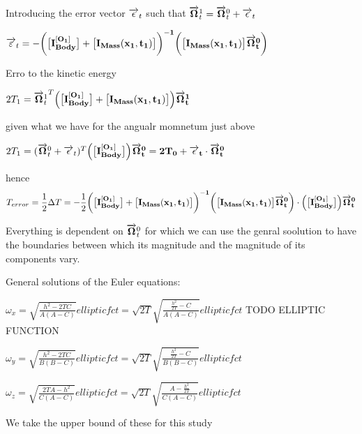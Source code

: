 Introducing the error vector $\overrightarrow{\bf \epsilon}_{t}$ such that $\overrightarrow{\bf \Omega}^{1}_{t}=\overrightarrow{\bf \Omega}^{0}_{t}+\overrightarrow{\bf \epsilon}_{t}$

$\overrightarrow{\bf \varepsilon}_{t}=-\bigg(\big[\bf I^{[O_1]}_{Body}\big] +\big [I_{Mass}(x_1,t_1)\big]\bigg)^{-1}\bigg(\big [I_{Mass}(x_1,t_1)\big] \overrightarrow{\bf \Omega}^{0}_{t} \bigg)$

Erro to the kinetic energy

$2T_{1}={\overrightarrow{\bf \Omega}^{1}_{t}}^{T} \Big(\big[\bf I^{[O_1]}_{Body}\big] +\big [I_{Mass}(x_1,t_1)\big]\Big) \overrightarrow{\bf \Omega}^{1}_{t}$

given what we have for the angualr momnetum just above

$2T_{1}=(\overrightarrow{\bf \Omega}^{0}_{t}+\overrightarrow \epsilon_{t})^{T} \Big(\big[\bf I^{[O_1]}_{Body}\big]\Big) \overrightarrow{\bf \Omega}^{0}_{t}=2T_{0}+ \overrightarrow \epsilon_{t} \cdot \overrightarrow{\bf \Omega}^{0}_{t}$

hence
$$ T_{error}=\frac{1}{2}\Delta T= -\frac{1}{2} \bigg(\big[\bf I^{[O_1]}_{Body}\big] +\big [I_{Mass}(x_1,t_1)\big]\bigg)^{-1}\bigg(\big [I_{Mass}(x_1,t_1)\big] \overrightarrow{\bf \Omega}^{0}_{t} \bigg) \cdot \Big(\big[\bf I^{[O_1]}_{Body}\big]\Big) \overrightarrow{\bf \Omega}^{0}_{t} $$

Everything is dependent on $\overrightarrow{\bf \Omega}^{0}_{t}$ for which we can use the genral soolution to have the boundaries between which its magnitude and the magnitude of its components vary.


General solutions of the Euler equations:

$\omega_{x}=\sqrt{\frac{h^2 - 2TC}{A(A-C)}} elliptic fct=\sqrt{2T}\sqrt{\frac{\frac{h^2}{2T} - C}{A(A-C)}} elliptic fct$ TODO ELLIPTIC FUNCTION

$\omega_{y}=\sqrt{\frac{h^2 - 2TC}{B(B-C)}} elliptic fct=\sqrt{2T}\sqrt{\frac{\frac{h^2}{2T} - C}{B(B-C)}} elliptic fct$

$\omega_{z}=\sqrt{\frac{2TA - h^2}{C(A-C)}} elliptic fct=\sqrt{2T}\sqrt{\frac{A - \frac{h^2}{2T}}{C(A-C)}} elliptic fct$

We take the upper bound of these for this study

